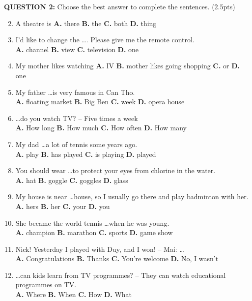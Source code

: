 \documentclass[a4paper,12pt]{article}
\begin{document}
\textbf{QUESTION 2:} Choose the best answer to complete the sentences. (2.5pts) \\
\begin{enumerate}[label=\arabic*.]
      \setcounter{enumi}{1}
      \item A theatre is \quad \textbf{A.} there \quad \textbf{B.} the \quad \textbf{C.} both \quad \textbf{D.} thing
      \item I’d like to change the \ldots . Please give me the remote control. \\
            \textbf{A.} channel \quad \textbf{B.} view \quad \textbf{C.} television \quad \textbf{D.} one
      \item My mother likes watching \quad \textbf{A.} IV \quad \textbf{B.} mother likes going shopping \quad \textbf{C.} or \quad \textbf{D.} one
      \item My father \ldots is very famous in Can Tho. \\
            \textbf{A.} floating market \quad \textbf{B.} Big Ben \quad \textbf{C.} week \quad \textbf{D.} opera house
      \item \ldots do you watch TV? – Five times a week \\
            \textbf{A.} How long \quad \textbf{B.} How much \quad \textbf{C.} How often \quad \textbf{D.} How many
      \item My dad \ldots a lot of tennis some years ago. \\
            \textbf{A.} play \quad \textbf{B.} has played \quad \textbf{C.} is playing \quad \textbf{D.} played
      \item You should wear \ldots to protect your eyes from chlorine in the water. \\
            \textbf{A.} hat \quad \textbf{B.} goggle \quad \textbf{C.} goggles \quad \textbf{D.} glass
      \item My house is near \ldots house, so I usually go there and play badminton with her. \\
            \textbf{A.} hers \quad \textbf{B.} her \quad \textbf{C.} your \quad \textbf{D.} you
      \item She became the world tennis \ldots when he was young. \\
            \textbf{A.} champion \quad \textbf{B.} marathon \quad \textbf{C.} sports \quad \textbf{D.} game show
      \item Nick! Yesterday I played with Duy, and I won! – Mai: \ldots \\
            \textbf{A.} Congratulations \quad \textbf{B.} Thanks \quad \textbf{C.} You’re welcome \quad \textbf{D.} No, I wasn’t
      \item \ldots can kids learn from TV programmes? – They can watch educational programmes on TV. \\
            \textbf{A.} Where \quad \textbf{B.} When \quad \textbf{C.} How \quad \textbf{D.} What
\end{enumerate}
\end{document}
